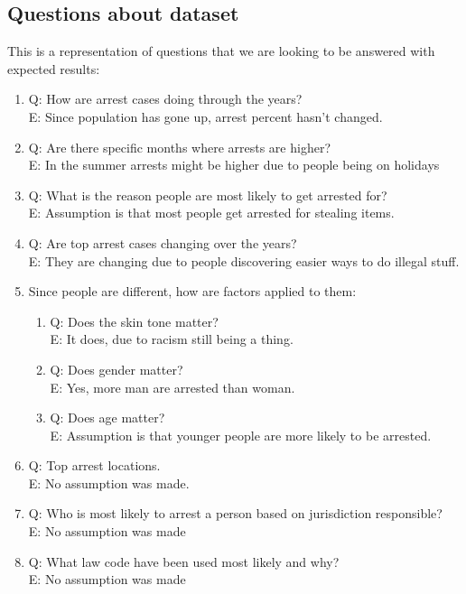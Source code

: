 \documentclass{article}\usepackage[]{graphicx}\usepackage[]{color}
\begin{document}
        \subsection {Questions about dataset}
          This is a representation of questions that we are looking to be answered with expected results:
          \begin{enumerate}
            \item	
              Q: How are arrest cases doing through the years?\\
              E: Since population has gone up, arrest percent hasn’t changed.
            \item
              Q: Are there specific months where arrests are higher?\\
              E: In the summer arrests might be higher due to people being on holidays
            \item
              Q: What is the reason people are most likely to get arrested for?\\
              E: Assumption is that most people get arrested for stealing items.
            \item
              Q: Are top arrest cases changing over the years?\\
              E: They are changing due to people discovering easier ways to do illegal stuff.
            \item
              Since people are different, how are factors applied to them:
              \begin{enumerate}
                \item
                  Q: Does the skin tone matter?\\
                  E: It does, due to racism still being a thing. 
                \item
                  Q: Does gender matter?\\
                  E: Yes, more man are arrested than woman. 
                \item
                  Q: Does age matter?\\
                  E: Assumption is that younger people are more likely to be arrested.
              \end{enumerate}
            \item
              Q:  Top arrest locations.\\
              E: No assumption was made.
            \item
              Q: Who is most likely to arrest a person based on jurisdiction responsible?\\
              E: No assumption was made
            \item
              Q: What law code have been used most likely and why?\\
              E: No assumption was made
          \end{enumerate}
      
\end{document}
